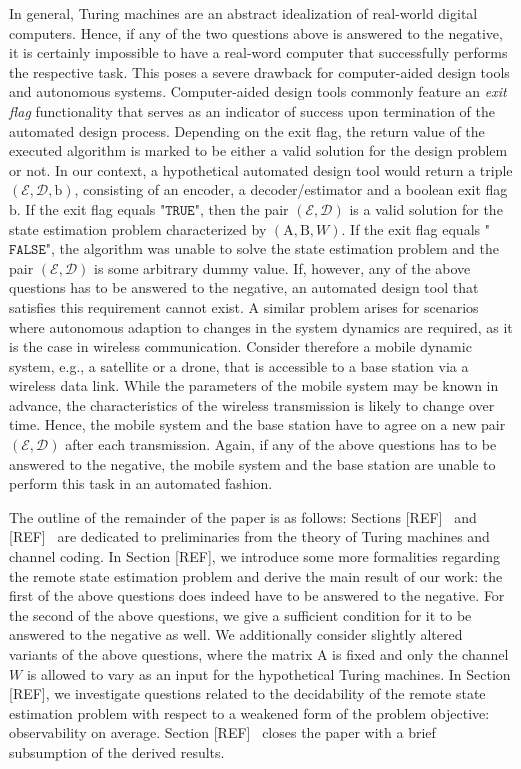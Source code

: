 \documentclass[conference]{IEEEtran}
\def\E{{\mathcal E}}
\def\D{{\mathcal D}}
\def\mA{\bm{\mathrm{A}}}
\def\mB{\bm{\mathrm{B}}}
\newcommand{\rdummy}{{\color{red}[REF]}}
\newcommand{\col}{\color{black}}
\begin{document}
	In general, Turing machines are an abstract idealization of real-world digital computers. Hence, if any of the two questions above is answered to the negative, 
	it is certainly impossible to have a real-word computer that successfully performs the respective task. This poses a severe drawback for computer-aided design tools 
	and autonomous systems. Computer-aided design tools commonly feature an \emph{exit flag} functionality that serves as an indicator of success upon termination of the 
	automated design process. Depending on the exit flag, the return value of the executed algorithm is marked to be either a valid solution for the design problem or not. 
	In our context, a hypothetical automated design tool would return a triple \((\E,\D, \mathrm{b})\), consisting of an encoder, a decoder/estimator and a boolean exit flag 
	\(\mathrm{b}\). If the exit flag equals "\(\mathtt{TRUE}\)", then the pair \((\E,\D)\) is a valid solution for the state estimation problem characterized by \((\mA,\mB,W)\). 
	If the exit flag equals "\(\mathtt{FALSE}\)", the algorithm was unable to solve the state estimation problem and the pair \((\E,\D)\) is some arbitrary dummy value. 
	If, however, any of the above questions has to be answered to the negative, an automated design tool that satisfies this requirement cannot exist. A similar problem arises 
	for scenarios where autonomous adaption to changes in the system dynamics are required, as it is the case in wireless communication. Consider therefore a mobile dynamic system, 
	e.g., a satellite or a drone, that is accessible to a base station via a wireless data link. While the parameters of the mobile system may be known in advance, the characteristics 
	of the wireless transmission is likely to change over time. Hence, the mobile system and the base station have to agree on a new pair \((\E,\D)\) after each transmission. 
	Again, if any of the above questions has to be answered to the negative, the mobile system and the base station are unable to perform this task in an automated fashion.

	The outline of the remainder of the paper is as follows:
	Sections \rdummy~ and \rdummy~ are dedicated to preliminaries from the theory of Turing machines and channel coding. In Section \rdummy, we introduce some more formalities 
	regarding the remote state estimation problem and derive the main result of our work: the first of the above questions does indeed have to be answered to the negative. 
	{\col For the second of the above questions, we give a sufficient condition for it to be answered to the negative as well.} We additionally consider slightly altered variants 
	of the above questions, where the matrix \(\mA\) is fixed and only the channel \(W\) is allowed to vary as an input for the hypothetical Turing machines. In Section \rdummy, 
	we investigate questions related to the decidability of the remote state estimation problem with respect to a weakened form of the problem objective: observability on average. 
	Section \rdummy~ closes the paper with a brief subsumption of the derived results.
\end{document}
